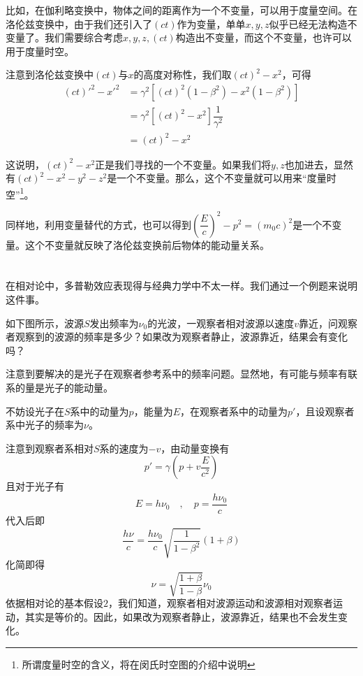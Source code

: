 比如，在伽利略变换中，物体之间的距离作为一个不变量，可以用于度量空间。在洛伦兹变换中，由于我们还引入了$(ct)$作为变量，单单$x,y,z$似乎已经无法构造不变量了。我们需要综合考虑$x,y,z,(ct)$构造出不变量，而这个不变量，也许可以用于度量时空。

注意到洛伦兹变换中$(ct)$与$x$的高度对称性，我们取$(ct)^2-x^2$，可得
\begin{equation}
	\begin{aligned}
		{(ct)'}^2-{x'}^2&=\gamma^2[(ct)^2(1-\beta^2)-x^2(1-\beta^2)]\\
		&=\gamma^2[(ct)^2-x^2]\dfrac{1}{\gamma^2}\\
		&=(ct)^2-x^2
	\end{aligned}
\end{equation}

这说明，$(ct)^2-x^2$正是我们寻找的一个不变量。如果我们将$y,z$也加进去，显然有$(ct)^2-x^2-y^2-z^2$是一个不变量。那么，这个不变量就可以用来``度量时空''\footnote{所谓度量时空的含义，将在闵氏时空图的介绍中说明}。

同样地，利用变量替代的方式，也可以得到$\left(\dfrac{E}{c}\right)^2-p^2=\left(m_0c\right)^2$是一个不变量。这个不变量就反映了洛伦兹变换前后物体的能动量关系。
\section[多普勒效应]{}
在相对论中，多普勒效应表现得与经典力学中不太一样。我们通过一个例题来说明这件事。
\begin{ex}[光的多普勒效应]
    如下图所示，波源$S$发出频率为$\nu_0$的光波，一观察者相对波源以速度$v$靠近，问观察者观察到的波源的频率是多少？如果改为观察者静止，波源靠近，结果会有变化吗？
\end{ex}
\begin{so}[光的多普勒效应]
	注意到要解决的是光子在观察者参考系中的频率问题。显然地，有可能与频率有联系的量是光子的能动量。
	
	不妨设光子在$S$系中的动量为$p$，能量为$E$，在观察者系中的动量为$p'$，且设观察者系中光子的频率为$\nu$。
	
	注意到观察者系相对$S$系的速度为$-v$，由动量变换有
    \[p'=\gamma\left(p+v\frac{E}{c^2}\right)\]
    且对于光子有
    \[E=h\nu_0\quad,\quad p=\dfrac{h\nu_0}{c}\]
    代入后即
    \[\frac{h\nu}{c}=\frac{h\nu_0}{c}\sqrt{\frac{1}{1-\beta^2}}(1+\beta)\]
    化简即得
    \[\nu=\sqrt{\frac{1+\beta}{1-\beta}}\nu_0\]
    依据相对论的基本假设$2$，我们知道，观察者相对波源运动和波源相对观察者运动，其实是等价的。因此，如果改为观察者静止，波源靠近，结果也不会发生变化。
\end{so}
